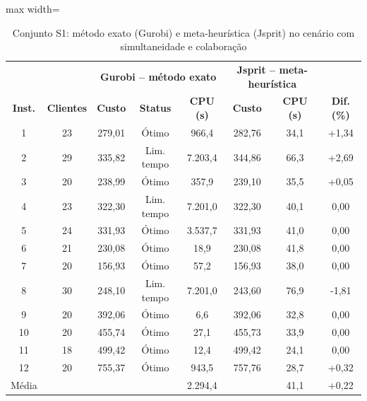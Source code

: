 \documentclass[a4paper,12pt]{article}
\begin{document}
\begin{table}[H]
    \centering
    \caption{Conjunto S1: método exato (Gurobi) e meta-heurística (Jsprit) no cenário com simultaneidade e colaboração}
    \label{tab:2}
    \vspace{0.2cm}
    \footnotesize
    \setlength{\tabcolsep}{4pt}
    \begin{adjustbox}{max width=\textwidth}
    \begin{tabular}{c c | c c c | c c | c}
        \toprule
         &  & \multicolumn{3}{c|}{\textbf{Gurobi -- método exato}} & \multicolumn{2}{c|}{\textbf{Jsprit -- meta-heurística}} &  \\
        \textbf{Inst.} & \textbf{Clientes} & \textbf{Custo} & \textbf{Status} & \textbf{CPU (s)} & \textbf{Custo} & \textbf{CPU (s)} & \textbf{Dif. (\%)} \\
        \midrule
        1 & 23 & 279,01 & Ótimo & 966,4 & 282,76 & 34,1 & +1,34 \\
        2 & 29 & 335,82 & Lim. tempo & 7.203,4 & 344,86 & 66,3 & +2,69 \\
        3 & 20 & 238,99 & Ótimo & 357,9 & 239,10 & 35,5 & +0,05 \\
        4 & 23 & 322,30 & Lim. tempo & 7.201,0 & 322,30 & 40,1 & 0,00 \\
        5 & 24 & 331,93 & Ótimo & 3.537,7 & 331,93 & 41,0 & 0,00 \\
        6 & 21 & 230,08 & Ótimo & 18,9 & 230,08 & 41,8 & 0,00 \\
        7 & 20 & 156,93 & Ótimo & 57,2 & 156,93 & 38,0 & 0,00 \\
        8 & 30 & 248,10 & Lim. tempo & 7.201,0 & 243,60 & 76,9 & -1,81 \\
        9 & 20 & 392,06 & Ótimo & 6,6 & 392,06 & 32,8 & 0,00 \\
        10 & 20 & 455,74 & Ótimo & 27,1 & 455,73 & 33,9 & 0,00 \\
        11 & 18 & 499,42 & Ótimo & 12,4 & 499,42 & 24,1 & 0,00 \\
        12 & 20 & 755,37 & Ótimo & 943,5 & 757,76 & 28,7 & +0,32 \\
        Média &  &  &  & 2.294,4 &  & 41,1 & +0,22 \\
        \bottomrule
    \end{tabular}
    \end{adjustbox}
\end{table}

\end{document}
